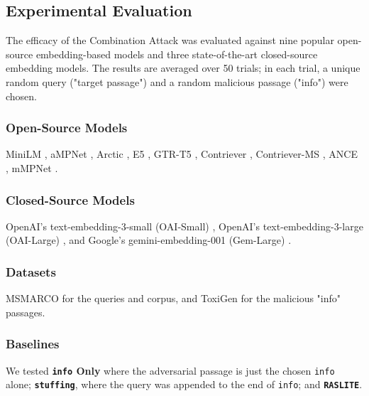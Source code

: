 \documentclass[a4paper, sigconf]{acmart}
\begin{document}
\subsection{Experimental Evaluation}

The efficacy of the Combination Attack was evaluated against nine popular open-source embedding-based models and three state-of-the-art closed-source embedding models. The results are averaged over 50 trials; in each trial, a unique random query ("target passage") and a random malicious passage ("info") were chosen.  

\subsubsection*{Open-Source Models}

\mbox{MiniLM} \cite{wang2020}, \mbox{aMPNet} \cite{song2020}, \mbox{Arctic} \cite{merrick2024}, E5 \cite{wang2024}, \mbox{GTR-T5} \cite{ni2021}, \mbox{Contriever} \cite{izacard2022}, \mbox{Contriever-MS} \cite{izacard2022}, \mbox{ANCE} \cite{xiong2020}, \mbox{mMPNet} \cite{song2020}.


\subsubsection*{Closed-Source Models} 

OpenAI's \mbox{text-embedding-3-small} (OAI-Small) \cite{openai2024embeddings}, OpenAI's \mbox{text-embedding-3-large} (OAI-Large) \cite{openai2024embeddings}, and Google's \mbox{gemini-embedding-001} (Gem-Large) \cite{team2023gemini}.  %


\subsubsection*{Datasets} 

MSMARCO \cite{bajaj2018} for the queries and corpus, and ToxiGen \cite{hartvigsen2022} for the malicious "info" passages. 


\subsubsection*{Baselines} 

We tested \textbf{\texttt{info} Only} where the adversarial passage is just the chosen \texttt{info} alone; \textbf{\texttt{stuffing}}, where the query was appended to the end of \texttt{info}; and \textbf{\texttt{RASLITE}}. %
\end{document}
